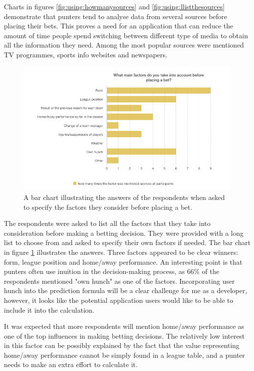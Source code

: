 Charts in figures \ref{fig:using:howmanysources} and \ref{fig:using:llistthesources} demonstrate that punters tend to analyse data from several sources before placing their bets. This proves a need for an application that can reduce the amount of time people spend switching between different type of media to obtain all the information they need. Among the most popular sources were mentioned TV programmes, sports info websites and newspapers.

\begin{figure}[H]
	\begin{center}
		\includegraphics[width=1.0\columnwidth]{req/images/listYourFactors.png}
		\caption{A bar chart illustrating the answers of the respondents when asked to specify the factors they consider before placing a bet.} 
		\label{fig:using:listyourfactors}
	\end{center}
\end{figure}

The respondents were asked to list all the factors that they take into consideration before making a betting decision. They were provided with a long list to choose from and asked to specify their own factors if needed. The bar chart in figure \ref{fig:using:listyourfactors} illustrates the answers. Three factors appeared to be clear winners: form, league position and home/away performance. An interesting point is that punters often use inuition in the decision-making process, as 66\% of the respondents mentioned "own hunch" as one of the factors. Incorporating user hunch into the prediction formula will be a clear challenge for me as a developer, however, it looks like the potential application users would like to be able to include it into the calculation. 

It was expected that more respondents will mention home/away performance as one of the top influences in making betting decisions. The relatively low interest in this factor can be possibly explained by the fact that the value representing home/away performance cannot be simply found in a league table, and a punter needs to make an extra effort to calculate it.

